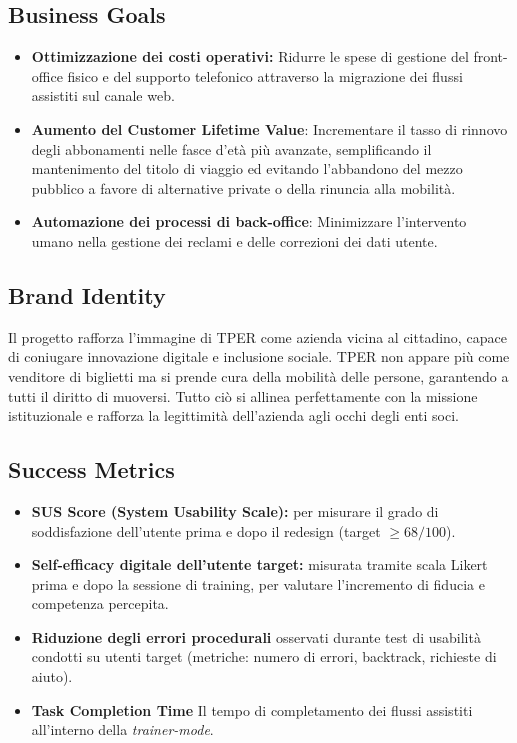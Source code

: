 \documentclass[11pt,a4paper]{article}
\begin{document}
\subsection{Business Goals}
\begin{itemize}[leftmargin=*]
\item \textbf{Ottimizzazione dei costi operativi:} Ridurre le spese di gestione del front-office fisico e del supporto telefonico attraverso la migrazione dei flussi assistiti sul canale web.

\item \textbf{Aumento del Customer Lifetime Value}: Incrementare il tasso di rinnovo degli abbonamenti nelle fasce d'età più avanzate, semplificando il mantenimento del titolo di viaggio ed evitando l'abbandono del mezzo pubblico a favore di alternative private o della rinuncia alla mobilità.

\item \textbf{Automazione dei processi di back-office}: Minimizzare l'intervento umano nella gestione dei reclami e delle correzioni dei dati utente.

\end{itemize}

\subsection{Brand Identity}
Il progetto rafforza l'immagine di TPER come azienda vicina al cittadino, capace di coniugare innovazione digitale e inclusione sociale. TPER non appare più come venditore di biglietti ma si prende cura della mobilità delle persone, garantendo a tutti il diritto di muoversi. Tutto ciò si allinea perfettamente con la missione istituzionale e rafforza la legittimità dell'azienda agli occhi degli enti soci.

\subsection{Success Metrics}
\begin{itemize}[leftmargin=*]
    \item \textbf{SUS Score (System Usability Scale):} per misurare il grado di soddisfazione dell'utente prima e dopo il redesign (target $\geq 68/100$).
    \item \textbf{Self-efficacy digitale dell'utente target:} misurata tramite scala Likert prima e dopo la sessione di training, per valutare l'incremento di fiducia e competenza percepita.
    \item \textbf{Riduzione degli errori procedurali} osservati durante test di usabilità condotti su utenti target (metriche: numero di errori, backtrack, richieste di aiuto).
    \item \textbf{Task Completion Time} 
    Il tempo di completamento dei flussi assistiti all'interno della \textit{trainer-mode}.
\end{itemize}
\end{document}
